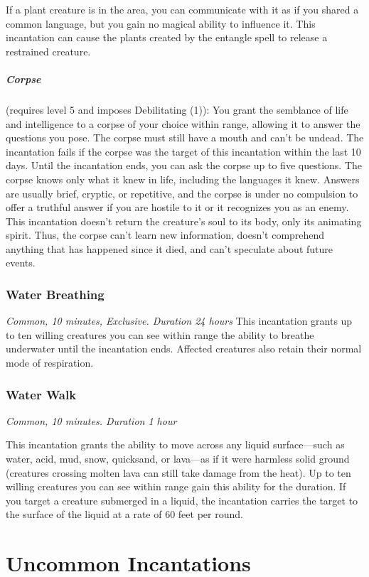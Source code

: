 If a plant creature is in the area, you can communicate with it as if you shared a common language, but you gain no magical ability to influence it. This incantation can cause the plants created by the entangle spell to release a restrained creature.

\subparagraph*{Corpse} (requires level 5 and imposes Debilitating (1)): You grant the semblance of life and intelligence to a corpse of your choice within range, allowing it to answer the questions you pose. The corpse must still have a mouth and can't be undead. The incantation fails if the corpse was the target of this incantation within the last 10 days.
Until the incantation ends, you can ask the corpse up to five questions. The corpse knows only what it knew in life, including the languages it knew. Answers are usually brief, cryptic, or repetitive, and the corpse is under no compulsion to offer a truthful answer if you are hostile to it or it recognizes you as an enemy. This incantation doesn't return the creature's soul to its body, only its animating spirit. Thus, the corpse can't learn new information, doesn't comprehend anything that has happened since it died, and can't speculate about future events.

\subsubsection{Water Breathing}
\textit{Common, 10 minutes, Exclusive. Duration 24 hours}
This incantation grants up to ten willing creatures you can see within range the ability to breathe underwater until the incantation ends. Affected creatures also retain their normal mode of respiration.

\subsubsection{Water Walk}
\textit{Common, 10 minutes. Duration 1 hour}

This incantation grants the ability to move across any liquid surface—such as water, acid, mud, snow, quicksand, or lava—as if it were harmless solid ground (creatures crossing molten lava can still take damage from the heat). Up to ten willing creatures you can see within range gain this ability for the duration. If you target a creature submerged in a liquid, the incantation carries the target to the surface of the liquid at a rate of 60 feet per round.

\section{Uncommon Incantations}
